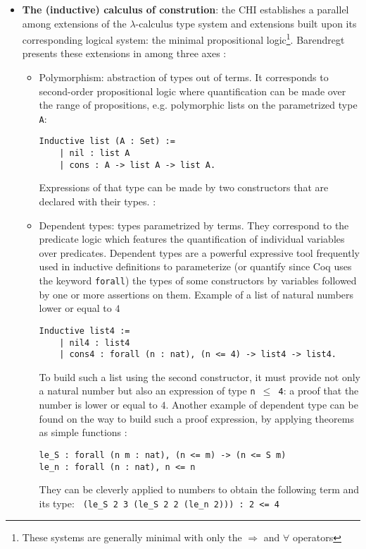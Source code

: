 \documentclass{article}
\begin{document}
\begin{itemize}
            \item \textbf{The (inductive) calculus of constrution}: the CHI establishes a parallel among extensions of the $\lambda$-calculus type system and extensions built upon its corresponding logical system: the minimal propositional logic\footnote{These systems are generally minimal with only the $\Rightarrow$ and $\forall$ operators}. Barendregt presents these extensions in \cite{10.5555/162552.162561} among three axes :
                \begin{itemize}
                    \item Polymorphism: abstraction of types out of terms. It corresponds to second-order propositional logic where quantification can be made over the range of propositions, e.g. polymorphic lists on the parametrized type \texttt{A}:
                    \begin{verbatim}Inductive list (A : Set) :=
    | nil : list A 
    | cons : A -> list A -> list A.\end{verbatim}
                     Expressions of that type can be made by two constructors that are declared with their types.  : 
                    
                    \item Dependent types: types parametrized by terms. They correspond to the predicate logic which features the quantification of individual variables over predicates. Dependent types are a powerful expressive tool frequently used in inductive definitions to parameterize (or quantify since Coq uses the keyword \texttt{forall}) the types of some constructors by variables followed by one or more assertions on them. Example of a list of natural numbers lower or equal to $4$
                     \begin{verbatim}Inductive list4 :=
    | nil4 : list4 
    | cons4 : forall (n : nat), (n <= 4) -> list4 -> list4.\end{verbatim}
                    To build such a list using the second constructor, it must provide not only a natural number but also an expression of type \texttt{n $\leq$ 4}: a proof that the number is lower or equal to $4$. Another example of dependent type can be found on the way to build such a proof expression, by applying theorems as simple functions :
                    \begin{verbatim}
le_S : forall (n m : nat), (n <= m) -> (n <= S m)
le_n : forall (n : nat), n <= n
                    \end{verbatim}
                    They can be cleverly applied to numbers to obtain the following term and its type: \verb| (le_S 2 3 (le_S 2 2 (le_n 2))) : 2 <= 4|


\end{itemize}
\end{itemize}
\end{document}
